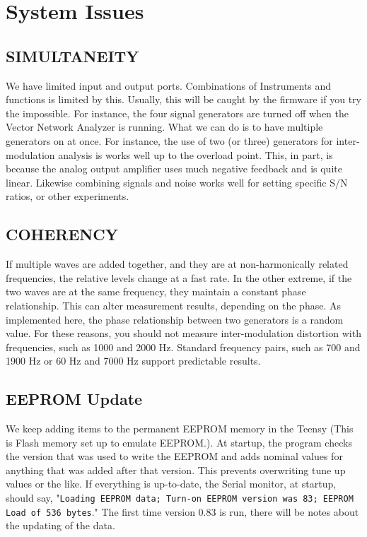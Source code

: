 \section{System Issues}
\label{sect:Sys}

\subsection{SIMULTANEITY}  We have limited input and output ports.  Combinations of Instruments and functions is limited by this.  Usually, this will be caught by the firmware if you try the impossible.  For instance, the four signal generators are turned off when the Vector Network Analyzer is running.  What we can do is to have multiple generators on at once.  For instance, the use of two (or three) generators for inter-modulation analysis is works well up to the overload point.  This, in part, is because the analog output amplifier uses much negative feedback and is quite linear.  Likewise combining signals and noise works well for setting specific S/N ratios, or other experiments.

\subsection{COHERENCY} If multiple waves are added together, and they are at non-harmonically related frequencies, the relative levels change at a fast rate.  In the other extreme, if the two waves are at the same frequency, they maintain a constant phase relationship. This can alter measurement results, depending on the phase. As implemented here, the phase relationship between two generators is a random  value.  For these reasons, you should not measure inter-modulation distortion with frequencies, such as 1000 and 2000 Hz.  Standard frequency pairs, such as 700 and 1900 Hz or 60 Hz and 7000 Hz support predictable results.

\subsection{EEPROM Update} We keep adding items to the permanent EEPROM memory in the Teensy (This is Flash memory set up to emulate EEPROM.).  At startup, the program checks the version that was used to write the EEPROM and adds nominal values for anything that was added after that version.  This prevents overwriting tune up values or the like.  If everything is up-to-date, the Serial monitor, at startup, should say, "\texttt{Loading EEPROM data; Turn-on EEPROM version was 83; EEPROM Load of 536 bytes}."  The first time version 0.83 is run, there will be notes about the updating of the data.
